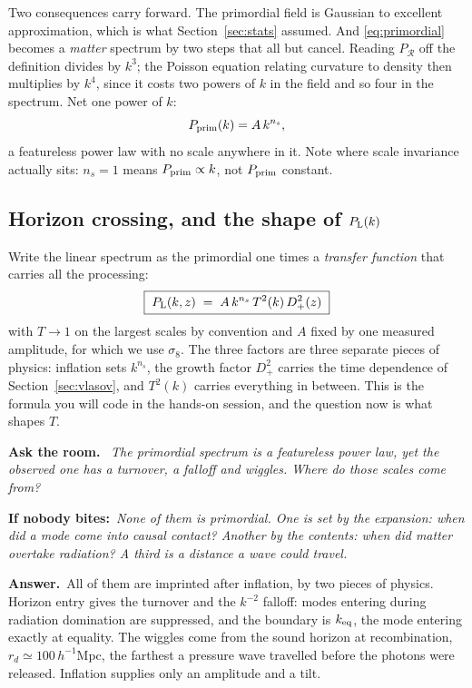 \documentclass[a4paper,11pt]{article}
\def\Plin{P_{\rm L}}
\numberwithin{equation}{section}
\newenvironment{quiz}
  {\par\medskip\noindent\begingroup\small\color{RoyalBlue!65!black}%
   \textbf{Ask the room.}\ \itshape}
  {\endgroup\par\medskip}
\newcommand{\nudge}[1]{\upshape\par\smallskip\hspace*{1.2em}\textbf{If nobody bites:}\ \itshape #1}
\newcommand{\answer}[1]{\upshape\par\smallskip\hspace*{1.2em}\textbf{Answer.}\ #1}
\begin{document}
Two consequences carry forward. The primordial field is Gaussian to excellent
approximation, which is what Section~\ref{sec:stats} assumed. And
\eqref{eq:primordial} becomes a \emph{matter} spectrum by two steps that all but
cancel. Reading $P_{\mathcal{R}}$ off the definition divides by $k^3$; the Poisson
equation relating curvature to density then multiplies by $k^4$, since it costs
two powers of $k$ in the field and so four in the spectrum. Net one power of
$k$:
\begin{equation}
P_{\rm prim}(k) = A\,k^{n_s} ,
\label{eq:pprim}
\end{equation}
a featureless power law with no scale anywhere in it. Note where scale
invariance actually sits: $n_s = 1$ means $P_{\rm prim} \propto k$, not
$P_{\rm prim}$ constant.

\subsection{Horizon crossing, and the shape of \texorpdfstring{$\Plin(k)$}{P(k)}}
\label{sec:linearpk}

Write the linear spectrum as the primordial one times a \emph{transfer function}
that carries all the processing:
\begin{equation}
\boxed{\;\Plin(k,z) \;=\; A\,k^{n_s}\,T^2(k)\,D_+^2(z)\;}
\label{eq:pk_master}
\end{equation}
with $T \to 1$ on the largest scales by convention and $A$ fixed by one measured
amplitude, for which we use $\sigma_8$. The three factors are three separate
pieces of physics: inflation sets $k^{n_s}$, the growth factor $D_+^2$ carries
the time dependence of Section~\ref{sec:vlasov}, and $T^2(k)$ carries everything
in between. This is the formula you will code in the hands-on session, and the
question now is what shapes $T$.

\begin{quiz}
The primordial spectrum is a featureless power law, yet the observed one has a
turnover, a falloff and wiggles. Where do those scales come from?
\nudge{None of them is primordial. One is set by the expansion: when did a mode come into causal contact? Another by the contents: when did matter overtake radiation? A third is a distance a wave could travel.}
\answer{All of them are imprinted after inflation, by two pieces of physics.
Horizon entry gives the turnover and the $k^{-2}$ falloff: modes entering during
radiation domination are suppressed, and the boundary is $k_{\rm eq}$, the mode
entering exactly at equality. The wiggles come from the sound horizon at
recombination, $r_d \simeq 100\,h^{-1}$Mpc, the farthest a pressure wave
travelled before the photons were released. Inflation supplies only an amplitude
and a tilt.}
\end{quiz}
\end{document}
